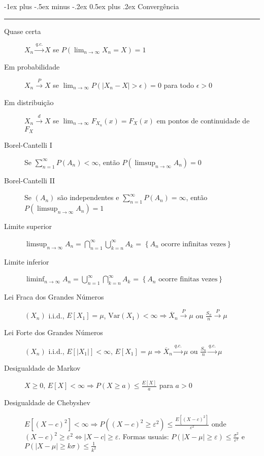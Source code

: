 \documentclass[10pt,landscape]{article}
\makeatletter
\renewcommand{\section}{\@startsection{section}{1}{0mm}%
                                {-1ex plus -.5ex minus -.2ex}%
                                {0.5ex plus .2ex}%
                                {\normalfont\small\bfseries}}
\makeatother
\begin{document}
\raggedright
\scriptsize
\begin{multicols}{3}

\setlength{\premulticols}{1pt}
\setlength{\postmulticols}{1pt}
\setlength{\multicolsep}{1pt}
\setlength{\columnsep}{2pt}


\section{Convergência}\smallskip \hrule height 2pt \smallskip
    \begin{description}
        \item[Quase certa] $X_n \xrightarrow{q.c.} X$ se $P\left(\lim_{n \to \infty} X_n = X\right) = 1$
        \item[Em probabilidade] $X_n \xrightarrow{P} X$ se $\lim_{n \to \infty} P\left(\left|X_n - X\right| > \epsilon\right) = 0$ para todo $\epsilon > 0$
        \item[Em distribuição] $X_n \xrightarrow{d} X$ se $\lim_{n \to \infty} F_{X_n}(x) = F_X(x)$ em pontos de continuidade de $F_X$
        \item[Borel-Cantelli I] Se $\sum_{n=1}^{\infty} P(A_n) < \infty$, então $P\left(\limsup_{n \to \infty} A_n\right) = 0$
        \item[Borel-Cantelli II] Se $(A_n)$ são independentes e $\sum_{n=1}^{\infty} P(A_n) = \infty$, então $P\left(\limsup_{n \to \infty} A_n\right) = 1$
        \item[Limite superior] $\limsup_{n \to \infty} A_n = \bigcap_{n=1}^{\infty} \bigcup_{k=n}^{\infty} A_k$ = $\left\{A_n \text{ ocorre infinitas vezes}\right\}$
        \item[Limite inferior] $\liminf_{n \to \infty} A_n = \bigcup_{n=1}^{\infty} \bigcap_{k=n}^{\infty} A_k$ = $\left\{A_n \text{ ocorre finitas vezes}\right\}$
        \item[Lei Fraca dos Grandes Números] $(X_n)$ i.i.d., $E[X_1] = \mu$, $\text{Var}(X_1) < \infty \Rightarrow \overline{X}_n \xrightarrow{P} \mu$ ou $\frac{S_n}{n} \xrightarrow{P} \mu$
        \item[Lei Forte dos Grandes Números] $(X_n)$ i.i.d., $E\left[\left|X_1\right|\right] < \infty$, $E[X_1] = \mu \Rightarrow \overline{X}_n \xrightarrow{q.c.} \mu$ ou $\frac{S_n}{n} \xrightarrow{q.c.} \mu$
        \item[Desigualdade de Markov] $X \geq 0$, $E[X] < \infty \Rightarrow P\left(X \geq a\right) \leq \frac{E[X]}{a}$ para $a > 0$
        \item[Desigualdade de Chebyshev] $E\left[\left(X - c\right)^2\right] < \infty \Rightarrow P\left(\left(X - c\right)^2 \geq \varepsilon^2\right) \leq \frac{E\left[\left(X - c\right)^2\right]}{\varepsilon^2}$ onde $\left(X - c\right)^2 \geq \varepsilon^2 \Leftrightarrow \left|X - c\right| \geq \varepsilon$. Formas usuais: $P\left(\left|X - \mu\right| \geq \varepsilon\right) \leq \frac{\sigma^2}{\varepsilon^2}$ e $P\left(\left|X - \mu\right| \geq k\sigma\right) \leq \frac{1}{k^2}$


\end{description}
\end{multicols}
\end{document}
